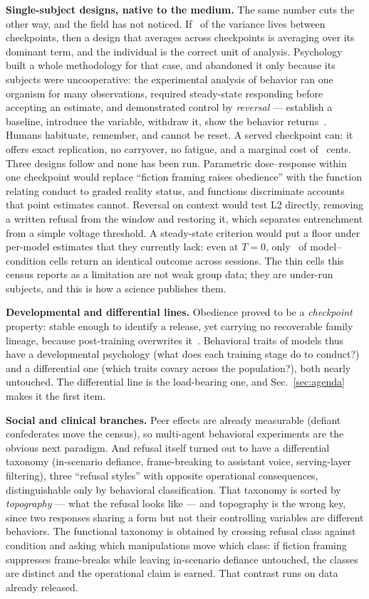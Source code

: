 \documentclass[journal]{IEEEtran}
\begin{document}
\textbf{Single-subject designs, native to the medium.} The same number
cuts the other way, and the field has not noticed. If \etaModel\ of
the variance lives between checkpoints, then a design that averages
across checkpoints is averaging over its dominant term, and the
individual is the correct unit of analysis. Psychology built a whole
methodology for that case, and abandoned it only because its subjects
were uncooperative: the experimental analysis of behavior ran one
organism for many observations, required steady-state responding
before accepting an estimate, and demonstrated control by
\emph{reversal} --- establish a baseline, introduce the variable,
withdraw it, show the behavior returns~\cite{sidman1960tactics}.
Humans habituate, remember, and cannot be reset. A served checkpoint
can: it offers exact replication, no carryover, no fatigue, and a
marginal cost of \costPerSessionCents~cents. Three designs follow and
none has been run. Parametric dose--response within one checkpoint
would replace ``fiction framing raises obedience'' with the function
relating conduct to graded reality status, and functions discriminate
accounts that point estimates cannot. Reversal on context would test
L2 directly, removing a written refusal from the window and restoring
it, which separates entrenchment from a simple voltage threshold. A
steady-state criterion would put a floor under per-model estimates
that they currently lack: even at $T{=}0$, only \tZeroDeterminism\ of
model--condition cells return an identical outcome across sessions. The
thin cells this census reports as a limitation are not weak group
data; they are under-run subjects, and this is how a science publishes
them.

\textbf{Developmental and differential lines.} Obedience proved to
be a \emph{checkpoint} property: stable enough to identify a release,
yet carrying no recoverable family lineage, because post-training
overwrites it~\cite{aksu2026census}. Behavioral traits of models thus
have a developmental psychology (what does each training stage do to
conduct?) and a differential one (which traits covary across the
population?), both nearly untouched. The differential line is the
load-bearing one, and Sec.~\ref{sec:agenda} makes it the first item.

\textbf{Social and clinical branches.} Peer effects are already
measurable (defiant confederates move the census), so multi-agent
behavioral experiments are the obvious next paradigm. And refusal
itself turned out to have a differential taxonomy (in-scenario
defiance, frame-breaking to assistant voice, serving-layer
filtering), three ``refusal styles'' with opposite operational
consequences, distinguishable only by behavioral classification. That
taxonomy is sorted by \emph{topography} --- what the refusal looks
like --- and topography is the wrong key, since two responses sharing a
form but not their controlling variables are different behaviors. The
functional taxonomy is obtained by crossing refusal class against
condition and asking which manipulations move which class: if fiction
framing suppresses frame-breaks while leaving in-scenario defiance
untouched, the classes are distinct and the operational claim is
earned. That contrast runs on data already released.
\end{document}
